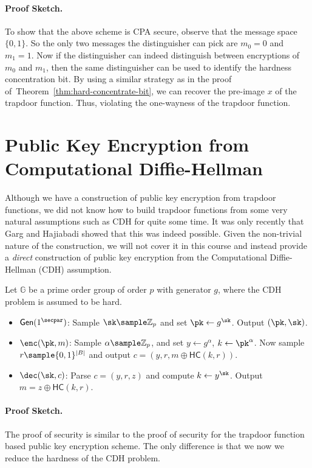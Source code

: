 \paragraph{Proof Sketch.} To show that the above scheme is CPA secure, observe that the message space $\{0,1\}$. So the only two messages the distinguisher can pick are $m_0=0$ and $m_1=1$. Now if the distinguisher can indeed distinguish between encryptions of $m_0$ and $m_1$, then the same distinguisher can be used to identify the hardness concentration bit. By using a similar strategy as in the proof of~Theorem~\ref{thm:hard-concentrate-bit}, we can recover the pre-image $x$ of the trapdoor function. Thus, violating the one-wayness of the trapdoor function.

\section{Public Key Encryption from Computational Diffie-Hellman}
Although we have a construction of public key encryption from trapdoor functions, we did not know how to build trapdoor functions from some very natural assumptions such as CDH for quite some time. It was only recently that Garg and Hajiabadi%
showed that this was indeed possible. Given the non-trivial nature of the construction, we will not cover it in this course and instead provide a \emph{direct} construction of public key encryption from the Computational Diffie-Hellman (CDH) assumption.

Let $\mathbb{G}$ be a prime order group of order $p$ with generator $g$, where the CDH problem is assumed to be hard.
\begin{itemize}
    \item $\gen(1^\secpar)$: Sample $\sk \sample \mathbb{Z}_p$ and set $\pk \gets g^\sk$. Output $(\pk, \sk)$.
    \item $\enc(\pk, m)$: Sample $\alpha \sample \mathbb{Z}_p$, and set $y \gets g^\alpha$, $k \gets \pk^\alpha$. Now sample $r \sample \{0,1\}^{|B|}$ and output $c = (y, r, m \oplus \mathsf{HC}(k, r))$.
    \item $\dec(\sk, c)$: Parse $c = (y, r, z)$ and compute $k \gets y^\sk$. Output $m = z \oplus \mathsf{HC}(k, r)$.
\end{itemize}

\paragraph{Proof Sketch.} The proof of security is similar to the proof of security for the trapdoor function based public key encryption scheme. The only difference is that we now we reduce the hardness of the CDH problem.

